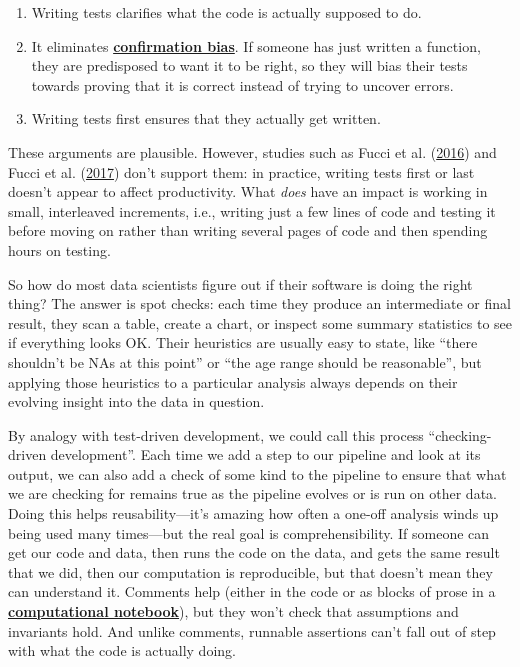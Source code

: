 \documentclass[
]{krantz}
\newcommand{\gref}[2]{\hyperlink{#2}{\textbf{#1}}}
\begin{document}
\begin{enumerate}
\def\labelenumi{\arabic{enumi}.}
\item
  Writing tests clarifies what the code is actually supposed to do.
\item
  It eliminates \gref{confirmation bias}{confirmation\_bias}.
  If someone has just written a function,
  they are predisposed to want it to be right,
  so they will bias their tests towards proving that it is correct
  instead of trying to uncover errors.
\item
  Writing tests first ensures that they actually get written.
\end{enumerate}

These arguments are plausible.
However,
studies such as Fucci et al. (\protect\hyperlink{ref-Fucc2016}{2016}) and Fucci et al. (\protect\hyperlink{ref-Fucc2017}{2017}) don't support them:
in practice,
writing tests first or last doesn't appear to affect productivity.
What \emph{does} have an impact is working in small, interleaved increments,
i.e.,
writing just a few lines of code and testing it before moving on
rather than writing several pages of code and then spending hours on testing.

So how do most data scientists figure out if their software is doing the right thing?
The answer is spot checks:
each time they produce an intermediate or final result,
they scan a table, create a chart, or inspect some summary statistics
to see if everything looks OK.
Their heuristics are usually easy to state,
like ``there shouldn't be NAs at this point'' or ``the age range should be reasonable'',
but applying those heuristics to a particular analysis always depends on
their evolving insight into the data in question.

By analogy with test-driven development,
we could call this process ``checking-driven development''.
Each time we add a step to our pipeline and look at its output,
we can also add a check of some kind to the pipeline to ensure that
what we are checking for remains true as the pipeline evolves or is run on other data.
Doing this helps reusability---it's amazing how often a one-off analysis
winds up being used many times---but the real goal is comprehensibility.
If someone can get our code and data,
then runs the code on the data,
and gets the same result that we did,
then our computation is reproducible,
but that doesn't mean they can understand it.
Comments help
(either in the code or as blocks of prose in a \gref{computational notebook}{computational\_notebook}),
but they won't check that assumptions and invariants hold.
And unlike comments,
runnable assertions can't fall out of step with what the code is actually doing.
\end{document}
